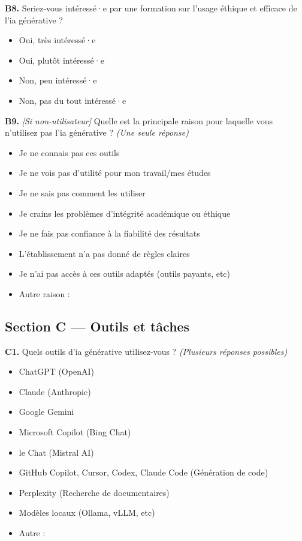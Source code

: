 \textbf{B8.} Seriez-vous intéressé·e par une formation sur l'usage éthique et efficace de l'\gls{ia} générative ?
\begin{itemize}[label=$\square$, leftmargin=1.5cm]
  \item Oui, très intéressé·e
  \item Oui, plutôt intéressé·e
  \item Non, peu intéressé·e
  \item Non, pas du tout intéressé·e
\end{itemize}

\textbf{B9.} \textit{[Si non-utilisateur]} Quelle est la principale raison pour laquelle vous n'utilisez pas l'\gls{ia} générative ? \textit{(Une seule réponse)}
\begin{itemize}[label=$\square$, leftmargin=1.5cm]
  \item Je ne connais pas ces outils
  \item Je ne vois pas d'utilité pour mon travail/mes études
  \item Je ne sais pas comment les utiliser
  \item Je crains les problèmes d'intégrité académique ou éthique
  \item Je ne fais pas confiance à la fiabilité des résultats
  \item L'établissement n'a pas donné de règles claires
  \item Je n'ai pas accès à ces outils adaptés (outils payants, etc)
  \item Autre raison : \underline{\hspace{4cm}}
\end{itemize}

\medskip

\subsection{Section C — Outils et tâches}

\textbf{C1.} Quels outils d'\gls{ia} générative utilisez-vous ? \textit{(Plusieurs réponses possibles)}
\begin{itemize}[label=$\square$, leftmargin=1.5cm]
  \item ChatGPT (OpenAI)
  \item Claude (Anthropic)
  \item Google Gemini
  \item Microsoft Copilot (Bing Chat)
  \item le Chat (Mistral AI)
  \item GitHub Copilot, Cursor, Codex, Claude Code (Génération de code)
  \item Perplexity (Recherche de documentaires)
  \item Modèles locaux (Ollama, vLLM, etc)
  \item Autre : \underline{\hspace{4cm}}
\end{itemize}

